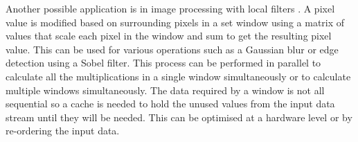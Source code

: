 Another possible application is in image processing with local filters \cite{image_process}. A pixel value is modified based on surrounding pixels in a set window using a matrix of values that scale each pixel in the window and sum to get the resulting pixel value. This can be used for various operations such as a Gaussian blur or edge detection using a Sobel filter. This process can be performed in parallel to calculate all the multiplications in a single window simultaneously or to calculate multiple windows simultaneously. The data required by a window is not all sequential so a cache is needed to hold the unused values from the input data stream until they will be needed. This can be optimised at a hardware level or by re-ordering the input data.